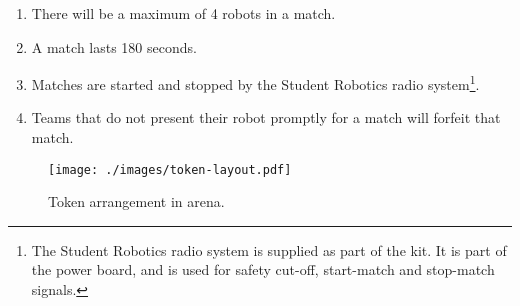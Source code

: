 \begin{enumerate}
\item There will be a maximum of 4 robots in a match.
\item A match lasts 180 seconds.
\item Matches are started and stopped by the Student Robotics radio system\footnote{The Student Robotics radio system is supplied as part of the kit.
 It is part of the power board, and is used for safety cut-off, start-match and stop-match signals.}.
\item Teams that do not present their robot promptly for a match will forfeit that match.
\end{enumerate}

\begin{figure}
  \begin{center}
    \texttt{[image: ./images/token-layout.pdf]}
  \end{center}
  \caption{\label{fig:token-arrangement}Token arrangement in arena.}
\end{figure}
